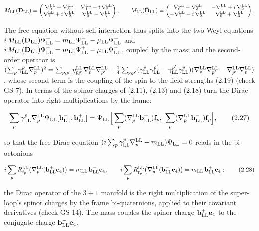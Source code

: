 \documentclass[
  10pt,
]{article}
\begin{document}
\[M_{\rm LL}(\mathbf D_{\rm LL})=\begin{pmatrix}\nabla^{\rm LL}_0+\nabla^{\rm LL}_3&\nabla^{\rm LL}_1-i\,\nabla^{\rm LL}_2\\\nabla^{\rm LL}_1+i\,\nabla^{\rm LL}_2&\nabla^{\rm LL}_0-\nabla^{\rm LL}_3\end{pmatrix},\qquad M_{\rm LL}(\bar{\mathbf D}_{\rm LL})=\begin{pmatrix}\nabla^{\rm LL}_0-\nabla^{\rm LL}_3&-\nabla^{\rm LL}_1+i\,\nabla^{\rm LL}_2\\-\nabla^{\rm LL}_1-i\,\nabla^{\rm LL}_2&\nabla^{\rm LL}_0+\nabla^{\rm LL}_3\end{pmatrix}.\]

The free equation without self-interaction thus splits into the two Weyl
equations
\(i\,M_{\rm LL}(\mathbf D_{\rm LL})\Psi^+_{\rm LL}=m_{\rm LL}\Psi^-_{\rm LL}-\mu_{\rm LL}\Psi^+_{\rm LL}\)
and
\(i\,M_{\rm LL}(\bar{\mathbf D}_{\rm LL})\Psi^-_{\rm LL}=m_{\rm LL}\Psi^+_{\rm LL}-\mu_{\rm LL}\Psi^-_{\rm LL}\),
coupled by the mass; and the second-order operator is
\((\sum_p\gamma^p_{\rm LL}\nabla^{\rm LL}_p)^2=\sum_{p,p'}\eta^{\rm LL}_{pp'}\nabla^{\rm LL}_p\nabla^{\rm LL}_{p'}+\tfrac14\sum_{p,p'}(\gamma^p_{\rm LL}\gamma^{p'}_{\rm LL}-\gamma^{p'}_{\rm LL}\gamma^p_{\rm LL})(\nabla^{\rm LL}_p\nabla^{\rm LL}_{p'}-\nabla^{\rm LL}_{p'}\nabla^{\rm LL}_p)\),
whose second term is the coupling of the spin to the field strengths
(2.19) (check GS-7). In terms of the spinor charges of (2.11), (2.13)
and (2.18) turn the Dirac operator into right multiplications by the
frame:

\[\sum_p\gamma^p_{\rm LL}\nabla^{\rm LL}_p\Psi_{\rm LL}[\mathbf b^-_{\rm LL},\mathbf b^+_{\rm LL}]=\Psi_{\rm LL}\Big[\sum_p(\nabla^{\rm LL}_p\mathbf b^+_{\rm LL})\bar{\mathbf f}_p,\ \sum_p(\nabla^{\rm LL}_p\mathbf b^-_{\rm LL})\mathbf f_p\Big],\tag{2.27}\]

so that the free Dirac equation
\((i\sum_p\gamma^p_{\rm LL}\nabla^{\rm LL}_p-m_{\rm LL})\Psi_{\rm LL}=0\)
reads in the bi-octonions

\[i\sum_pR^{\rm LL}_{\mathbf f_p}\big(\nabla^{\rm LL}_p(\mathbf b^+_{\rm LL}\mathbf e_4)\big)=m_{\rm LL}\,\mathbf b^-_{\rm LL}\mathbf e_4,\qquad i\sum_pR^{\rm LL}_{\bar{\mathbf f}_p}\big(\nabla^{\rm LL}_p(\mathbf b^-_{\rm LL}\mathbf e_4)\big)=m_{\rm LL}\,\mathbf b^+_{\rm LL}\mathbf e_4:\tag{2.28}\]

the Dirac operator of the \(3+1\) manifold is the right multiplication
of the super-loop's spinor charges by the frame bi-quaternions, applied
to their covariant derivatives (check GS-14). The mass couples the
spinor charge \(\mathbf b^+_{\rm LL}\mathbf e_4\) to the conjugate
charge \(\mathbf b^-_{\rm LL}\mathbf e_4\).
\end{document}
